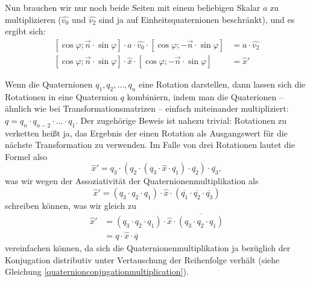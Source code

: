 Nun brauchen wir nur noch beide Seiten mit einem beliebigen Skalar $a$ zu multiplizieren ($\hat{v_0}$ und $\hat{v_2}$ sind ja auf Einheitsquaternionen beschränkt), und es ergibt sich:
\begin{equation}
\begin{split}
 \left[ \cos \varphi; \vec n \cdot \sin \varphi \right] \cdot a \cdot \hat{v_0} \cdot \left[ \cos \varphi; -\vec n \cdot \sin \varphi \right] &= a \cdot \hat{v_2} \\
 \left[ \cos \varphi; \vec n \cdot \sin \varphi \right] \cdot \hat{x} \cdot \left[ \cos \varphi; -\vec n \cdot \sin \varphi \right] &= \hat{x}'
\end{split}
\end{equation}

Wenn die Quaternionen $q_1, q_2, \ldots, q_n$ eine Rotation darstellen, dann lassen sich die Rotationen in eine Quaternion $q$ kombiniern, indem man die Quaterionen -- ähnlich wie bei Transformationsmatrizen -- einfach miteinander multipliziert: $q = q_n \cdot q_{n-2} \cdot \ldots \cdot q_1$. Der zugehörige Beweis ist nahezu trivial: Rotationen zu verketten heißt ja, das Ergebnis der einen Rotation als Ausgangswert für die nächste Transformation zu verwenden. Im Falle von drei Rotationen lautet die Formel also
\begin{equation}
 \hat{x}' = q_3 \cdot ( q_2 \cdot ( q_3 \cdot \hat{x} \cdot \overline{q_1} ) \cdot \overline{q_2} ) \cdot \overline{q_3},
\end{equation}
was wir wegen der Assoziativität der Quaternionenmultiplikation als 
\begin{equation}
 \hat{x}' = ( q_3 \cdot q_2 \cdot q_1 ) \cdot \hat{x} \cdot ( \overline{q_1} \cdot \overline{q_2} \cdot \overline{q_3} )
\end{equation}
schreiben können, was wir gleich zu
\begin{equation}
\begin{split}
 \hat{x}' &= ( q_3 \cdot q_2 \cdot q_1 ) \cdot \hat{x} \cdot \overline{( q_3 \cdot q_2 \cdot q_1 )} \\
 &= q \cdot \hat{x} \cdot \overline{q}
\end{split}
\end{equation} 
vereinfachen können, da sich die Quaternionenmultiplikation ja bezüglich der Konjugation distributiv unter Vertauschung der Reihenfolge verhält (siehe Gleichung \ref{quaternionconjugationmultiplication}).

